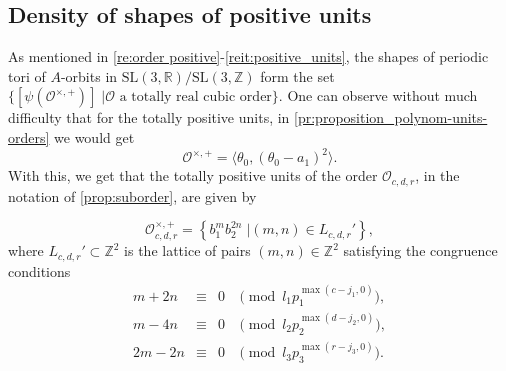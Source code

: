 \documentclass[11pt,letterpaper]{amsart}
\theoremstyle{definition}
\theoremstyle{remark}
\renewcommand{\rm}[1]{\mathrm{#1}}
\newcommand{\cal}[1]{\mathcal{#1}}
\newcommand{\bb}[1]{\mathbb{#1}}
\newcommand{\R}{\bb R}
\newcommand{\Z}{\bb Z}
\newcommand{\calO}{\cal O}
\newcommand{\SL}{\rm{SL}}
\begin{document}
\subsection{Density of shapes of positive units}
\label{ss:positive_units}

As mentioned in \cref{re:order positive}-\ref{reit:positive_units}, the shapes of periodic tori of $A$-orbits in $\SL(3,\R)/\SL(3,\Z)$
form the set
$\{[\psi(\calO^{\times, +} ) ]\;|{\calO \text{ a totally real cubic order}}\}$. One can observe without much difficulty that for the totally positive units, in \cref{pr:proposition_polynom-units-orders} we would get 	
		$$\mathcal{O}^{\times,+} = \langle \theta_0, (\theta_0 - a_1)^2 \rangle.$$
With this, we get that the totally positive units of the order $\calO_{c,d,r}$, in the notation of \cref{prop:suborder}, are given by 

$$\calO_{c,d,r}^{\times,+} =\left\lbrace b_1^m b_2^{2n} \; \bigg\vert  (m,n)  \in L_{c,d,r}' \right\rbrace,$$
where $L_{c,d,r}' \subset \Z^2$ is the lattice of pairs $(m,n) \in \Z^2$ satisfying the congruence conditions
$$\begin{array}{ cccl}
	m+2n &\equiv &0 &\pmod{ l_1 p_1^{\max( c-j_1,0)}},\\
	m-4n &\equiv &0 &\pmod{ l_2 p_2^{\max( d-j_2,0)}},\\
	2m-2n &\equiv &0 &\pmod{ l_3 p_3^{\max( r-j_3,0)}}.
\end{array}  $$
\end{document}
